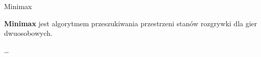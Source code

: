 \begin{frame}{Minimax}

  \textbf{Minimax} jest algorytmem przeszukiwania przestrzeni stanów rozgrywki dla gier dwuosobowych.
  
  \ldots







\end{frame}
